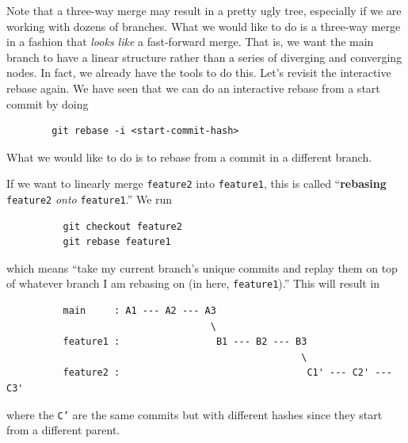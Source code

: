 \documentclass{article}
\begin{document}
      Note that a three-way merge may result in a pretty ugly tree, especially if we are working with dozens of branches. What we would like to do is a three-way merge in a fashion that \textit{looks like} a fast-forward merge. That is, we want the main branch to have a linear structure rather than a series of diverging and converging nodes. In fact, we already have the tools to do this. Let's revisit the interactive rebase again. We have seen that we can do an interactive rebase from a start commit by doing 
      \begin{lstlisting}
        git rebase -i <start-commit-hash>
      \end{lstlisting} 
      What we would like to do is to rebase from a commit in a different branch. 

      \begin{definition}[Rebase]
        If we want to linearly merge \texttt{feature2} into \texttt{feature1}, this is called ``\textbf{rebasing} \texttt{feature2} \textit{onto} \texttt{feature1}.'' We run 
        \begin{lstlisting}
          git checkout feature2 
          git rebase feature1
        \end{lstlisting} 
        which means ``take my current branch's unique commits and replay them on top of whatever branch I am rebasing on (in here, \texttt{feature1}).'' This will result in 
        \begin{lstlisting}
          main     : A1 --- A2 --- A3
                                    \
          feature1 :                 B1 --- B2 --- B3
                                                    \
          feature2 :                                 C1' --- C2' --- C3' 
        \end{lstlisting} 
        where the \texttt{C'} are the same commits but with different hashes since they start from a different parent. 
      \end{definition} 
\end{document}
